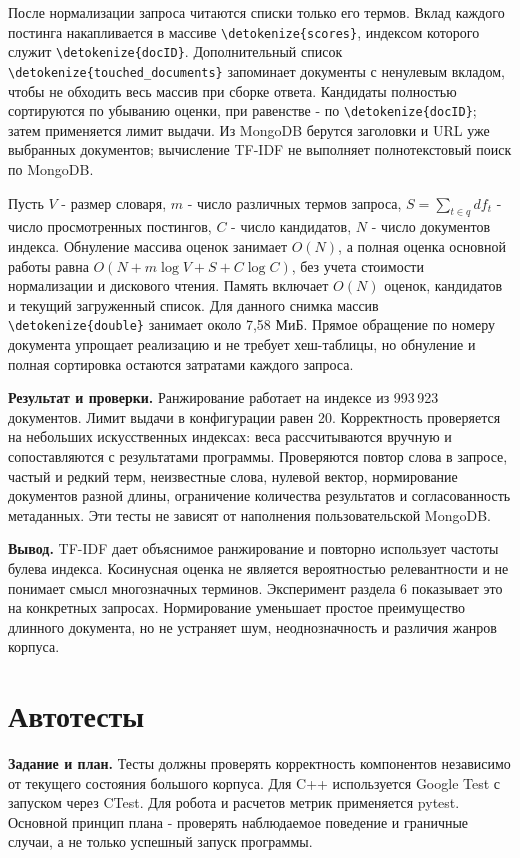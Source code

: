 \documentclass[pdf,unicode,12pt,a4paper,oneside,fleqn]{article}
\newcommand{\labsection}[2]{\par\Needspace{9\baselineskip}\setcounter{section}{\numexpr#1-1\relax}\section{#2}}
\newcommand{\partlabel}[1]{\par\Needspace{4\baselineskip}\medskip\textbf{#1.}\quad}
\DeclareRobustCommand{\code}[1]{\expandafter\nolinkurl\expandafter{\detokenize{#1}}}
\begin{document}
После нормализации запроса читаются списки только его термов. Вклад каждого
постинга накапливается в массиве \code{scores}, индексом которого служит
\code{docID}. Дополнительный список \code{touched_documents} запоминает
документы с ненулевым вкладом, чтобы не обходить весь массив при сборке ответа.
Кандидаты полностью сортируются по убыванию оценки, при равенстве - по
\code{docID}; затем применяется лимит выдачи. Из MongoDB берутся заголовки и URL уже выбранных
документов; вычисление TF-IDF не выполняет полнотекстовый поиск по MongoDB.

Пусть $V$ - размер словаря, $m$ - число различных термов запроса,
$S=\sum_{t\in q}df_t$ - число просмотренных постингов, $C$ - число кандидатов,
$N$ - число документов индекса. Обнуление массива оценок занимает $O(N)$,
а полная оценка основной работы равна
$O(N+m\log V+S+C\log C)$, без учета стоимости нормализации и дискового чтения.
Память включает $O(N)$ оценок, кандидатов и текущий загруженный список.
Для данного снимка массив \code{double} занимает около 7,58 МиБ.
Прямое обращение по номеру документа упрощает реализацию и не требует
хеш-таблицы, но обнуление и полная сортировка остаются затратами каждого запроса.

\partlabel{Результат и проверки}
Ранжирование работает на индексе из 993\,923 документов. Лимит выдачи в
конфигурации равен 20. Корректность проверяется на небольших искусственных
индексах: веса рассчитываются вручную и сопоставляются с результатами
программы. Проверяются повтор слова в запросе, частый и редкий терм,
неизвестные слова, нулевой вектор, нормирование документов разной длины,
ограничение количества результатов и согласованность метаданных.
Эти тесты не зависят от наполнения пользовательской MongoDB.

\partlabel{Вывод}
TF-IDF дает объяснимое ранжирование и повторно использует частоты булева
индекса. Косинусная оценка не является вероятностью релевантности и не понимает
смысл многозначных терминов. Эксперимент раздела 6 показывает это на конкретных
запросах. Нормирование уменьшает простое преимущество длинного документа,
но не устраняет шум, неоднозначность и различия жанров корпуса.

\labsection{17}{Автотесты}

\partlabel{Задание и план}
Тесты должны проверять корректность компонентов независимо от текущего
состояния большого корпуса. Для C++ используется Google Test с запуском
через CTest. Для робота и расчетов метрик применяется pytest. Основной принцип
плана - проверять наблюдаемое поведение и граничные случаи, а не только
успешный запуск программы.
\end{document}
